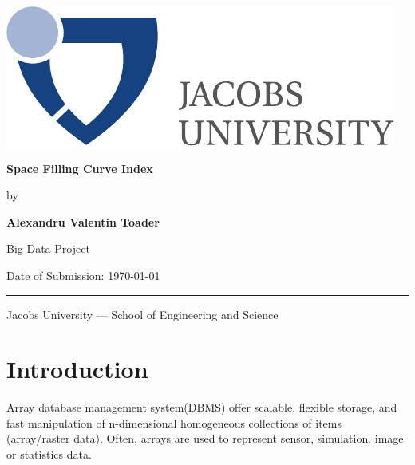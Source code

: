 \documentclass[11pt, a4paper, oneside]{article}
\newcommand{\myname}{Alexandru Valentin Toader}
\newcommand{\mytitle}{Space Filling Curve Index}
\begin{document}

  \thispagestyle{empty}

  \begin{flushright}
   \includegraphics[scale=0.7]{bsc-logo}
  \end{flushright}
  \vspace{20mm}
  \begin{center}
    \huge
    \textbf{\mytitle}
  \end{center}
  \vspace*{4mm}
  \begin{center}
   \Large by
  \end{center}
  \vspace*{4mm}
  \begin{center}
    \Large
    \textbf{\myname}
  \end{center}
  \vspace*{20mm}
  \begin{center}
    \large
    Big Data Project
  \end{center}
  \vfill
  \vspace*{8mm}
  \begin{flushleft}
    \large
    Date of Submission: \today \\
    \rule{\textwidth}{1pt}
  \end{flushleft}
  \begin{center}
    \Large Jacobs University --- School of Engineering and Science
  \end{center}

  \newpage


\newpage
\tableofcontents

\clearpage
{}

\section{Introduction}

Array database management system(DBMS) offer scalable, flexible storage, and fast manipulation of n-dimensional homogeneous collections of items (array/raster data). Often, arrays are used to represent sensor, simulation, image or statistics data. 
\end{document}
